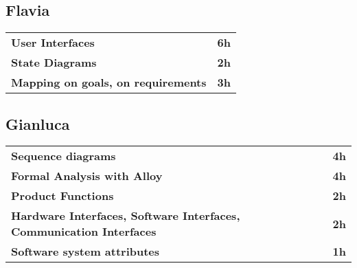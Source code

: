 \subsection*{Flavia}
\begin{table}[H]
    \begin{tabular}{lr}
        \toprule
        \textbf{User Interfaces} & \textbf{6h}  \\
        \textbf{State Diagrams}  & \textbf{2h} \\
        \textbf{Mapping on goals, on requirements} & \textbf{3h}   \\
        \bottomrule
    \end{tabular}
\end{table}

\subsection*{Gianluca}
\begin{table}[H]
    \begin{tabular}{lr}
        \toprule
        \textbf{Sequence diagrams}                                             & \textbf{4h} \\
        \textbf{Formal Analysis with Alloy}                                    & \textbf{4h}  \\
        \textbf{Product Functions}                                             & \textbf{2h} \\
        \textbf{Hardware Interfaces, Software Interfaces, Communication Interfaces}   & \textbf{2h}   \\
        \textbf{Software system attributes}                                    & \textbf{1h}   \\
        \bottomrule
    \end{tabular}
\end{table}